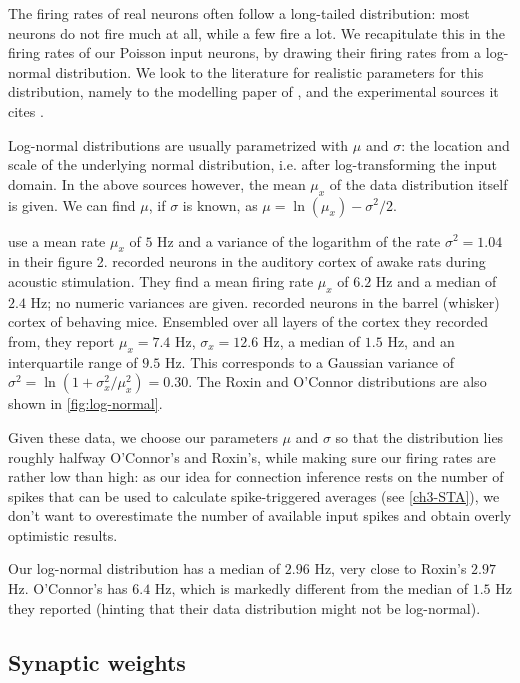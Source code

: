 The firing rates of real neurons often follow a long-tailed distribution: most neurons do not fire much at all, while a few fire a lot. We recapitulate this in the firing rates of our Poisson input neurons, by drawing their firing rates from a log-normal distribution. We look to the literature for realistic parameters for this distribution, namely to the modelling paper of , and the experimental sources it cites \cite{Hromadka2008SparseRepresentationSounds,OConnor2010NeuralActivityBarrel}.

Log-normal distributions are usually parametrized with $μ$ and $σ$: the location and scale of the underlying normal distribution, i.e. after log-transforming the input domain. In the above sources however, the mean $μ_x$ of the data distribution itself is given. We can find $μ$, if $σ$ is known, as $μ = \ln(μ_x) - σ^2 / 2$.

 use a mean rate $μ_x$ of $5$ Hz and a variance of the logarithm of the rate $σ^2 = 1.04$ in their figure 2.  recorded neurons in the auditory cortex of awake rats during acoustic stimulation. They find a mean firing rate $μ_x$ of $6.2$ Hz and a median of $2.4$ Hz; no numeric variances are given.  recorded neurons in the barrel (whisker) cortex of behaving mice. Ensembled over all layers of the cortex they recorded from, they report $μ_x = 7.4$ Hz, $σ_x = 12.6$ Hz, a median of $1.5$ Hz, and an interquartile range of $9.5$ Hz. This corresponds to a Gaussian variance of $σ^2 = \ln(1 + σ_x^2 / μ_x^2) = 0.30$. The Roxin and O'Connor distributions are also shown in \cref{fig:log-normal}.

Given these data, we choose our parameters $μ$ and $σ$ so that the distribution lies roughly halfway O'Connor's and Roxin's, while making sure our firing rates are rather low than high: as our idea for connection inference rests on the number of spikes that can be used to calculate spike-triggered averages (see \cref{ch3-STA}), we don't want to overestimate the number of available input spikes and obtain overly optimistic results.

Our log-normal distribution has a median of $2.96$ Hz, very close to Roxin's $2.97$ Hz. O'Connor's has $6.4$ Hz, which is markedly different from the median of $1.5$ Hz they reported (hinting that their data distribution might not be log-normal).

\subsection{Synaptic weights}
\label{sec:synaptic_weights}

